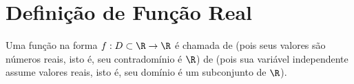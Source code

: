 \section{Definição de Função Real}

\begin{definition}
    Uma função na forma $f : D \subset \R \to \R$ é chamada de
 (pois seus valores são números reais, isto é, seu
contradomínio é $\R$) de  (pois sua variável
independente assume valores reais, isto é, seu domínio é um
subconjunto de $\R$).
\end{definition}